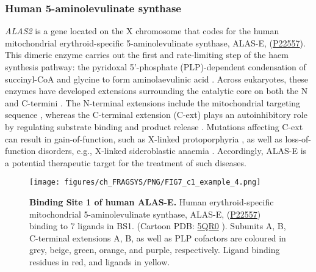 {\subsubsection{Human 5-aminolevulinate synthase}

\textit{ALAS2} is a gene located on the X chromosome that codes for the human mitochondrial erythroid-specific 5-aminolevulinate synthase, ALAS-E, (\href{https://www.uniprot.org/uniprotkb/P22557/entry}{P22557}). This dimeric enzyme carries out the first and rate-limiting step of the haem synthesis pathway: the pyridoxal 5’-phosphate (PLP)-dependent condensation of succinyl-CoA and glycine to form aminolaevulinic acid \cite{AKHTAR_1976_PORPHYRIN}. Across eukaryotes, these enzymes have developed extensions surrounding the catalytic core on both the N and C-termini \cite{MUNAKATA_1993_AMINOLEVULINATE}. The N-terminal extensions include the mitochondrial targeting sequence \cite{SRIVASTAVA_1988_AMINOLEVULINATE}, whereas the C-terminal extension (C-ext) plays an autoinhibitory role by regulating substrate binding and product release \cite{BAILEY_2020_AMINOLEVULINATE}. Mutations affecting C-ext can result in gain-of-function, such as X-linked protoporphyria \cite{WHATLEY_2008_AMINOLEVULINATE}, as well as loss-of-function disorders, e.g., X-linked sideroblastic anaemia \cite{DUCAMP_2011_SIDEROBLASTIC}. Accordingly, ALAS-E is a potential therapeutic target for the treatment of such diseases.

\begin{figure}[htb!]
    \centering
    \texttt{[image: figures/ch\_FRAGSYS/PNG/FIG7\_c1\_example\_4.png]}
    \caption[Binding Site 1 of human ALAS-E]{\textbf{Binding Site 1 of human ALAS-E.} Human erythroid-specific mitochondrial 5-amino\-levulinate synthase, ALAS-E, (\href{https://www.uniprot.org/uniprotkb/P22557/entry}{P22557}) binding to 7 ligands in BS1. (Cartoon PDB: \href{https://www.ebi.ac.uk/pdbe/entry/pdb/5qr0}{5QR0} \cite{PDB_5QR0}). Subunits A, B, C-terminal extensions A, B, as well as PLP cofactors are coloured in grey, beige, green, orange, and purple, respectively. Ligand binding residues in red, and ligands in yellow.}
    \label{fig:c1_example_4}
\end{figure}

}
